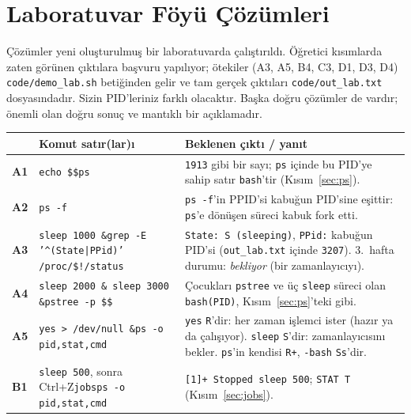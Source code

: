 \documentclass[11pt,a4paper]{article}
\newcommand{\cmd}[1]{\texttt{#1}}
\begin{document}
\section{Laboratuvar Föyü Çözümleri}
\label{sec:sol}

Çözümler yeni oluşturulmuş bir laboratuvarda çalıştırıldı. Öğretici kısımlarda zaten görünen çıktılara başvuru yapılıyor; ötekiler (A3, A5, B4, C3, D1, D3, D4) \texttt{code/demo\_lab.sh} betiğinden gelir ve tam gerçek çıktıları \texttt{code/out\_lab.txt} dosyasındadır. Sizin PID'leriniz farklı olacaktır. Başka doğru çözümler de vardır; önemli olan doğru sonuç ve mantıklı bir açıklamadır.

{\footnotesize
\renewcommand{\arraystretch}{1.2}
\begin{longtable}{@{}p{0.6cm}>{\raggedright\arraybackslash}p{7.3cm}>{\raggedright\arraybackslash}p{7.6cm}@{}}
\toprule
& \textbf{Komut satır(lar)ı} & \textbf{Beklenen çıktı / yanıt}\\
\midrule
\endhead
\textbf{A1} & \texttt{echo \$\$}\newline \texttt{ps} & \texttt{1913} gibi bir sayı; \cmd{ps} içinde bu PID'ye sahip satır \texttt{bash}'tir (Kısım~\ref{sec:ps}).\\
\textbf{A2} & \texttt{ps -f} & \texttt{ps -f}'in PPID'si kabuğun PID'sine eşittir: \cmd{ps}'e dönüşen süreci kabuk fork etti.\\
\textbf{A3} & \texttt{sleep 1000 \&}\newline \texttt{grep -E '\textasciicircum(State|PPid)' /proc/\$!/status} & \texttt{State: S (sleeping)}, \texttt{PPid:} kabuğun PID'si (\texttt{out\_lab.txt} içinde \texttt{3207}). 3.~hafta durumu: \emph{bekliyor} (bir zamanlayıcıyı).\\
\textbf{A4} & \texttt{sleep 2000 \& sleep 3000 \&}\newline \texttt{pstree -p \$\$} & Çocukları \texttt{pstree} ve üç \texttt{sleep} süreci olan \texttt{bash(PID)}, Kısım~\ref{sec:ps}'teki gibi.\\
\textbf{A5} & \texttt{yes > /dev/null \&}\newline \texttt{ps -o pid,stat,cmd} & \texttt{yes} \texttt{R}'dir: her zaman işlemci ister (hazır ya da çalışıyor). \texttt{sleep} \texttt{S}'dir: zamanlayıcısını bekler. \texttt{ps}'in kendisi \texttt{R+}, \texttt{-bash} \texttt{Ss}'dir.\\
\textbf{B1} & \texttt{sleep 500}, sonra Ctrl+Z\newline \texttt{jobs}\newline \texttt{ps -o pid,stat,cmd} & \texttt{[1]+ Stopped sleep 500}; \texttt{STAT T} (Kısım~\ref{sec:jobs}).\\

\end{longtable}}
\end{document}
